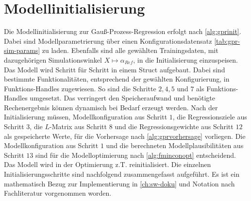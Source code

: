 \clearpage



\section{Modellinitialisierung}\label{sec:gprinit}


Die Modellinitialisierung zur Gauß-Prozess-Regression erfolgt nach \autoref{alg:gprinit}. Dabei sind Modellparametrierung über einen Konfigurationsdatensatz \autoref{tab:gpr-sim-params} zu laden. Ebenfalls sind alle gewählten Trainingsdaten, mit dazugehörigen Simulationswinkel $X \mapsto \alpha_{Ref}$, in die Initialisierung einzuspeisen. Das Modell wird Schritt für Schritt in einem Struct aufgebaut. Dabei sind bestimmte Funktionalitäten, entsprechend der gewählten Konfigurierung, in Funktions-Handles zugewiesen. So sind die Schritte $2, 4, 5$ und $7$ als Funktions-Handles umgesetzt. Das verringert den Speicheraufwand und benötigte Rechenergebnis können dynamisch bei Bedarf erzeugt werden. Nach der Initialisierung müssen, Modellkonfiguration aus Schritt $1$, die Regressionsziele aus Schritt $3$, die $L$-Matrix aus Schritt $8$ und die Regressionsgewichte aus Schritt $12$ als gespeicherte Werte, für die Vorhersage nach \autoref{alg:gprvorhersage} vorliegen. Die Modellkonfiguration aus Schritt $1$ und die berechneten Modellplausibilitäten aus Schritt $13$ sind für die Modelloptimierung nach \autoref{alg:fminconopt} entscheidend. Das Modell wird in der Optimierung z.T. reinitialisiert. Die einzelnen Initialisierungsschritte sind nachfolgend zusammengefasst aufgeführt. Es ist ein mathematisch Bezug zur Implementierung in \autoref{ch:sw-doku} und Notation nach Fachliteratur \cite{Rasmussen2006} vorgenommen worden.


